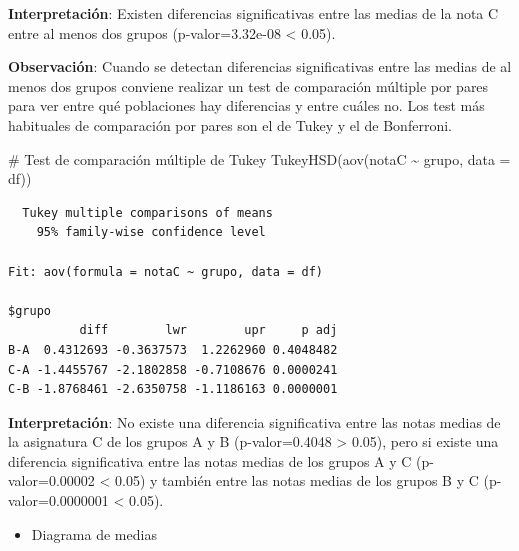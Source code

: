 \documentclass[
  spanish,
  a4paper,
]{scrreport}
\newenvironment{Shaded}{\begin{snugshade}}{\end{snugshade}}
\newcommand{\AttributeTok}[1]{\textcolor[rgb]{0.40,0.45,0.13}{#1}}
\newcommand{\CommentTok}[1]{\textcolor[rgb]{0.37,0.37,0.37}{#1}}
\newcommand{\FunctionTok}[1]{\textcolor[rgb]{0.28,0.35,0.67}{#1}}
\newcommand{\NormalTok}[1]{\textcolor[rgb]{0.00,0.23,0.31}{#1}}
\newcommand{\SpecialCharTok}[1]{\textcolor[rgb]{0.37,0.37,0.37}{#1}}
\providecommand{\tightlist}{%
  \setlength{\itemsep}{0pt}\setlength{\parskip}{0pt}}
\theoremstyle{definition}
\theoremstyle{definition}
\theoremstyle{remark}
\begin{document}
\textbf{Interpretación}: Existen diferencias significativas entre las
medias de la nota C entre al menos dos grupos (p-valor=3.32e-08
\textless{} 0.05).

\textbf{Observación}: Cuando se detectan diferencias significativas
entre las medias de al menos dos grupos conviene realizar un test de
comparación múltiple por pares para ver entre qué poblaciones hay
diferencias y entre cuáles no. Los test más habituales de comparación
por pares son el de Tukey y el de Bonferroni.

\begin{Shaded}
\begin{Highlighting}[]
\CommentTok{\# Test de comparación múltiple de Tukey}
\FunctionTok{TukeyHSD}\NormalTok{(}\FunctionTok{aov}\NormalTok{(notaC }\SpecialCharTok{\textasciitilde{}}\NormalTok{ grupo, }\AttributeTok{data =}\NormalTok{ df))}
\end{Highlighting}
\end{Shaded}

\begin{verbatim}
  Tukey multiple comparisons of means
    95% family-wise confidence level

Fit: aov(formula = notaC ~ grupo, data = df)

$grupo
          diff        lwr        upr     p adj
B-A  0.4312693 -0.3637573  1.2262960 0.4048482
C-A -1.4455767 -2.1802858 -0.7108676 0.0000241
C-B -1.8768461 -2.6350758 -1.1186163 0.0000001
\end{verbatim}

\textbf{Interpretación}: No existe una diferencia significativa entre
las notas medias de la asignatura C de los grupos A y B (p-valor=0.4048
\textgreater{} 0.05), pero si existe una diferencia significativa entre
las notas medias de los grupos A y C (p-valor=0.00002 \textless{} 0.05)
y también entre las notas medias de los grupos B y C (p-valor=0.0000001
\textless{} 0.05).

\begin{itemize}
\tightlist
\item
  Diagrama de medias
\end{itemize}
\end{document}
